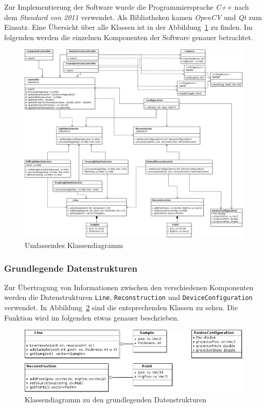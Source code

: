 \documentclass[ngerman,a4paper,parskip=half]{scrartcl}
\begin{document}
Zur Implementierung der Software wurde die Programmiersprache \emph{C++} nach dem \emph{Standard von 2011} verwendet. Als Bibliotheken kamen \emph{OpenCV} und \emph{Qt} zum Einsatz. Eine Übersicht über alle Klassen ist in der Abbildung~\ref{fig:classes_all} zu finden. Im folgenden werden die einzelnen Komponenten der Software genauer betrachtet.

\begin{figure}[p]
	\centering
	\includegraphics[width=\linewidth]{includes/classdiagram}
	\caption{Umfassendes Klassendiagramm}
	\label{fig:classes_all}
\end{figure}

\subsubsection{Grundlegende Datenstrukturen}

Zur Übertragung von Informationen zwischen den verschiedenen Komponenten werden die Datenstrukturen \texttt{Line}, \texttt{Reconstruction} und \texttt{DeviceConfiguration} verwendet. In Abbildung~\ref{fig:classes_base} sind die entsprechenden Klassen zu sehen. Die Funktion wird im folgenden etwas genauer beschrieben.

\begin{figure}
	\centering
	\includegraphics[width=\linewidth]{includes/classdiagram_base.png}
	\caption{Klassendiagramm zu den grundlegenden Datenstrukturen}
	\label{fig:classes_base}
\end{figure}
\end{document}
